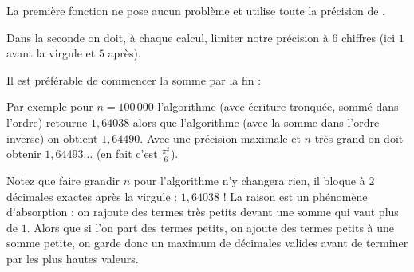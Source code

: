 \documentclass[class=report,crop=false]{standalone}
\begin{document}
La première fonction ne pose aucun problème et utilise toute la précision de \Python.

Dans la seconde on doit, à chaque calcul, limiter notre précision à $6$ chiffres
(ici $1$ avant la virgule et $5$ après).


Il est préférable de commencer la somme par la fin :


Par exemple pour $n = 100\, 000$ l'algorithme 
(avec écriture tronquée, sommé dans l'ordre) retourne $1,64038$ alors que
l'algorithme   (avec la somme dans l'ordre inverse)
on obtient $1,64490$. Avec une précision maximale et $n$ très grand
on doit obtenir $1,64493\ldots$ (en fait c'est $\frac{\pi^2}{6}$).

Notez que faire grandir $n$ pour l'algorithme 
n'y changera rien, il bloque à $2$ décimales exactes après la virgule : $1,64038$ !
La raison est un phénomène d’absorption : on rajoute des termes très petits devant une somme qui vaut plus de $1$.
Alors que si l'on part des termes petits, on ajoute des termes petits à une somme petite, on garde donc un maximum
de décimales valides avant de terminer par les plus hautes valeurs.

\end{document}
